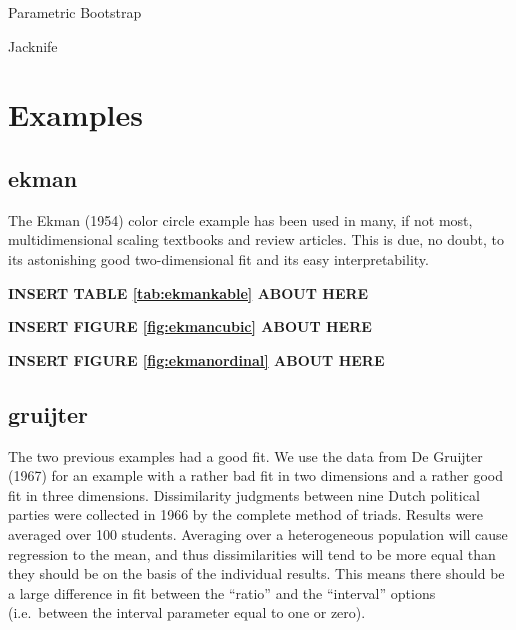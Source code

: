 \documentclass[
  12pt,
]{article}
\begin{document}
Parametric Bootstrap

Jacknife

\section{Examples}\label{examples}

\subsection{ekman}\label{ekman}

The Ekman (1954) color circle example has been used in many, if not most, multidimensional scaling textbooks and review articles. This is due, no doubt,
to its astonishing good two-dimensional fit and its easy interpretability.

\begin{greybox}

\begin{center}
\textbf{INSERT TABLE \ref{tab:ekmankable} ABOUT HERE}

\end{center}

\end{greybox}

\begin{greybox}

\begin{center}
\textbf{INSERT FIGURE \ref{fig:ekmancubic} ABOUT HERE}

\end{center}

\end{greybox}

\begin{greybox}

\begin{center}
\textbf{INSERT FIGURE \ref{fig:ekmanordinal} ABOUT HERE}

\end{center}

\end{greybox}

\subsection{gruijter}\label{gruijter}

The two previous examples had a good fit. We use the data from De Gruijter (1967)
for an example with a rather bad fit in two dimensions and a rather good fit in three dimensions.
Dissimilarity judgments between nine Dutch political parties were
collected in 1966 by the complete method of triads. Results were
averaged over 100 students. Averaging over a heterogeneous population
will cause regression to the mean, and thus dissimilarities will tend
to be more equal than they should be on the basis of the individual
results. This means there should be a large difference in fit between
the ``ratio'' and the ``interval'' options
(i.e.~between the interval parameter equal to one or zero).
\end{document}
